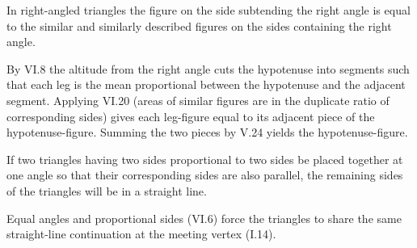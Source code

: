 \documentclass{rrxiv}
\begin{document}
\begin{claim}
\label{prop:VI.31}
In right-angled triangles the figure on the side subtending the right
angle is equal to the similar and similarly described figures on the
sides containing the right angle.
\end{claim}
\begin{evidence}[Proof of VI.31]
\label{ev:VI.31}
By VI.8 the altitude from the right angle cuts the hypotenuse into
segments such that each leg is the mean proportional between the
hypotenuse and the adjacent segment.  Applying VI.20 (areas of
similar figures are in the duplicate ratio of corresponding sides)
gives each leg-figure equal to its adjacent piece of the
hypotenuse-figure.  Summing the two pieces by V.24 yields the
hypotenuse-figure.
\end{evidence}

\begin{claim}
\label{prop:VI.32}
If two triangles having two sides proportional to two sides be placed
together at one angle so that their corresponding sides are also
parallel, the remaining sides of the triangles will be in a straight
line.
\end{claim}
\begin{evidence}[Proof of VI.32]
\label{ev:VI.32}
Equal angles and proportional sides (VI.6) force the triangles to
share the same straight-line continuation at the meeting vertex (I.14).
\end{evidence}
\end{document}
